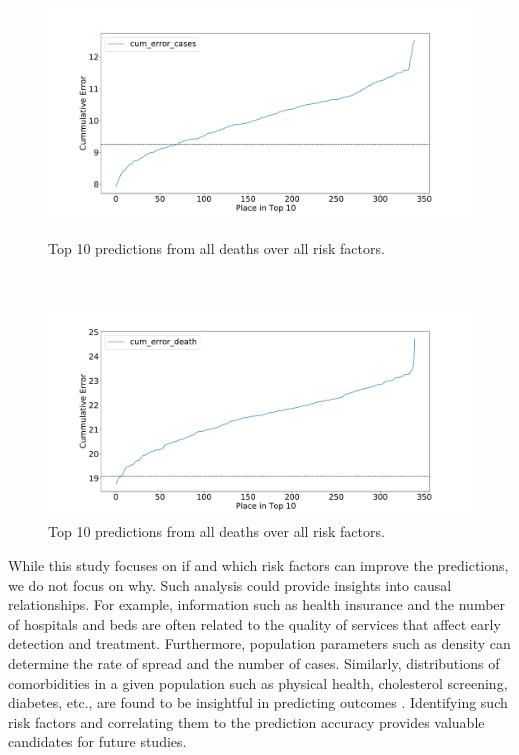 \documentclass[letterpaper, inpress]{jds} %
\renewcommand{\_}{%
    \textunderscore\hspace{0pt}%
}
\begin{document}
\begin{figure}[!h]
\begin{minipage}{.45\textwidth}
        \centering
        \includegraphics[width=1.0\textwidth]{images/predict/PlaceTop10_Cases.pdf}
        \vspace{-1cm}
        \caption{Top 10 predictions from all deaths  over all risk factors.}
        \label{fig:place-top10-cases}
    \end{minipage}
    \ \
    \begin{minipage}{.45\textwidth}
        
        \centering
        \includegraphics[width=1.0\textwidth]{images/predict/PlaceTop10_Death.pdf}
        \vspace{-1cm}
        \caption{Top 10 predictions from all deaths over all risk factors.}
        \label{fig:place-top10-death}
    \end{minipage}
\end{figure}



While this study focuses on if and which risk factors can improve the
predictions, we do not focus on why. Such analysis could provide
insights into causal relationships. For example, information such as
health insurance and the number of hospitals and beds are often
related to the quality of services that affect early detection and
treatment. Furthermore, population parameters such as density can
determine the rate of spread and the number of cases. Similarly,
distributions of comorbidities in a given population such as physical
health, cholesterol screening, diabetes, etc., are found to be
insightful in predicting outcomes \cite{Maleki}. Identifying such risk
factors and correlating them to the prediction accuracy provides
valuable candidates for future studies.
\end{document}
